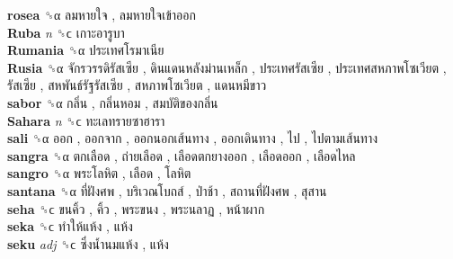 \textbf{rosea} ␝α   ลมหายใจ ,  ลมหายใจเข้าออก   \\
\textbf{Ruba} \emph{n}  ␝ϲ   เกาะอารูบา   \\
\textbf{Rumania} ␝α   ประเทศโรมาเนีย   \\
\textbf{Rusia} ␝α   จักรวรรดิรัสเซีย ,  ดินแดนหลังม่านเหล็ก ,  ประเทศรัสเซีย ,  ประเทศสหภาพโซเวียต ,  รัสเซีย ,  สหพันธ์รัฐรัสเซีย ,  สหภาพโซเวียต ,  แดนหมีขาว   \\
\textbf{sabor} ␝α   กลิ่น ,  กลิ่นหอม ,  สมบัติของกลิ่น   \\
\textbf{Sahara} \emph{n}  ␝ϲ   ทะเลทรายซาฮารา   \\
\textbf{sali} ␝α   ออก ,  ออกจาก ,  ออกนอกเส้นทาง ,  ออกเดินทาง ,  ไป ,  ไปตามเส้นทาง   \\
\textbf{sangra} ␝α   ตกเลือด ,  ถ่ายเลือด ,  เลือดตกยางออก ,  เลือดออก ,  เลือดไหล   \\
\textbf{sangro} ␝α   พระโลหิต ,  เลือด ,  โลหิต   \\
\textbf{santana} ␝α   ที่ฝังศพ ,  บริเวณโบถส์ ,  ป่าช้า ,  สถานที่ฝังศพ ,  สุสาน   \\
\textbf{seha} ␝ϲ   ขนคิ้ว ,  คิ้ว ,  พระขนง ,  พระนลาฏ ,  หน้าผาก   \\
\textbf{seka} ␝ϲ   ทำให้แห้ง ,  แห้ง   \\
\textbf{seku} \emph{adj}  ␝ϲ   ซึ่งน้ำนมแห้ง ,  แห้ง   \\
